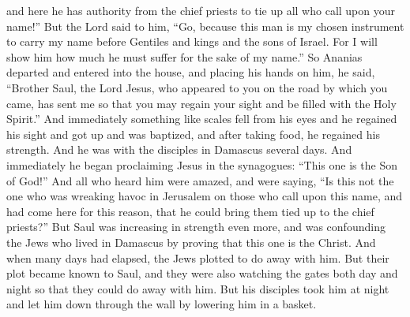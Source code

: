 \begin{biblechapter}
\verse and here he has authority from the chief priests to tie up all who call upon your name!”
\verse But the Lord said to him, “Go, because this man is my chosen instrument to carry my name before Gentiles and kings and the sons of Israel.
\verse For I will show him how much he must suffer for the sake of my name.”
\verse So Ananias departed and entered into the house, and placing his hands on him, he said, “Brother Saul, the Lord Jesus, who appeared to you on the road by which you came, has sent me so that you may regain your sight and be filled with the Holy Spirit.”
\verse And immediately something like scales fell from his eyes and he regained his sight and got up and was baptized,
\verse and after taking food, he regained his strength. And he was with the disciples in Damascus several days.
 And immediately he began proclaiming Jesus in the synagogues: “This one is the Son of God!”
\verse And all who heard him were amazed, and were saying, “Is this not the one who was wreaking havoc in Jerusalem on those who call upon this name, and had come here for this reason, that he could bring them tied up to the chief priests?”
\verse But Saul was increasing in strength even more, and was confounding the Jews who lived in Damascus by proving that this one is the Christ.
\verse And when many days had elapsed, the Jews plotted to do away with him.
\verse But their plot became known to Saul, and they were also watching the gates both day and night so that they could do away with him.
\verse But his disciples took him at night and let him down through the wall by lowering him in a basket.

\end{biblechapter}
